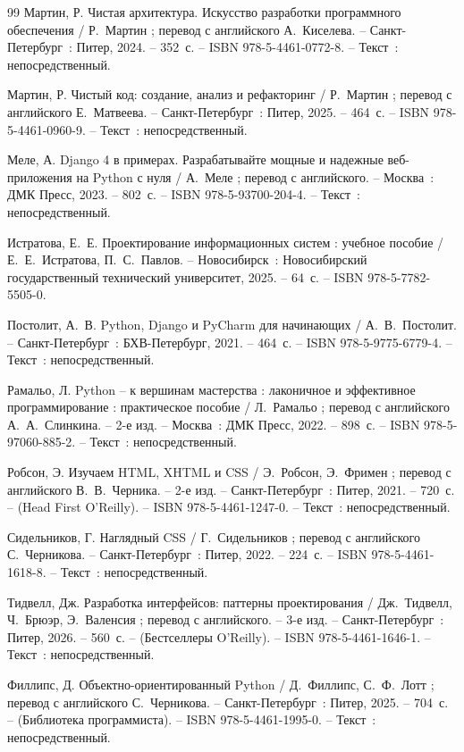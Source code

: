 \begin{thebibliography}{99}
     Мартин, Р. Чистая архитектура. Искусство разработки программного обеспечения / Р.~Мартин ; перевод с английского А.~Киселева. -- Санкт-Петербург~: Питер, 2024. -- 352~с. -- ISBN 978-5-4461-0772-8. -- Текст~: непосредственный.

     Мартин, Р. Чистый код: создание, анализ и рефакторинг / Р.~Мартин ; перевод с английского Е.~Матвеева. -- Санкт-Петербург~: Питер, 2025. -- 464~с. -- ISBN 978-5-4461-0960-9. -- Текст~: непосредственный.

     Меле, А. Django 4 в примерах. Разрабатывайте мощные и надежные веб-приложения на Python с нуля / А.~Меле ; перевод с английского. -- Москва~: ДМК Пресс, 2023. -- 802~с. -- ISBN 978-5-93700-204-4. -- Текст~: непосредственный.

     Истратова, Е.~Е. Проектирование информационных систем : учебное пособие / Е.~Е.~Истратова, П.~С.~Павлов. -- Новосибирск~: Новосибирский государственный технический университет, 2025. -- 64~с. -- ISBN 978-5-7782-5505-0.

     Постолит, А.~В. Python, Django и PyCharm для начинающих / А.~В.~Постолит. -- Санкт-Петербург~: БХВ-Петербург, 2021. -- 464~с. -- ISBN 978-5-9775-6779-4. -- Текст~: непосредственный.

     Рамальо, Л. Python -- к вершинам мастерства : лаконичное и эффективное программирование : практическое пособие / Л.~Рамальо ; перевод с английского А.~А.~Слинкина. -- 2-е изд. -- Москва~: ДМК Пресс, 2022. -- 898~с. -- ISBN 978-5-97060-885-2. -- Текст~: непосредственный.

     Робсон, Э. Изучаем HTML, XHTML и CSS / Э.~Робсон, Э.~Фримен ; перевод с английского В.~В.~Черника. -- 2-е изд. -- Санкт-Петербург~: Питер, 2021. -- 720~с. -- (Head First O'Reilly). -- ISBN 978-5-4461-1247-0. -- Текст~: непосредственный.

     Сидельников, Г. Наглядный CSS / Г.~Сидельников ; перевод с английского С.~Черникова. -- Санкт-Петербург~: Питер, 2022. -- 224~с. -- ISBN 978-5-4461-1618-8. -- Текст~: непосредственный.

     Тидвелл, Дж. Разработка интерфейсов: паттерны проектирования / Дж.~Тидвелл, Ч.~Брюэр, Э.~Валенсия ; перевод с английского. -- 3-е изд. -- Санкт-Петербург~: Питер, 2026. -- 560~с. -- (Бестселлеры O'Reilly). -- ISBN 978-5-4461-1646-1. -- Текст~: непосредственный.

     Филлипс, Д. Объектно-ориентированный Python / Д.~Филлипс, С.~Ф.~Лотт ; перевод с английского С.~Черникова. -- Санкт-Петербург~: Питер, 2025. -- 704~с. -- (Библиотека программиста). -- ISBN 978-5-4461-1995-0. -- Текст~: непосредственный.


\end{thebibliography}
